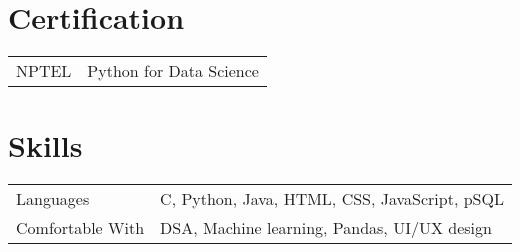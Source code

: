 \documentclass[a4paper,12pt]{article}
\begin{document}
\section{Certification}
\begin{tabularx}{\linewidth}{@{}l X@{}}
NPTEL & \normalsize{Python for Data Science} \\
\end{tabularx}

\section{Skills}
\begin{tabularx}{\linewidth}{@{}l X@{}}
Languages &  \normalsize{C, Python, Java, HTML, CSS, JavaScript, pSQL}\\
Comfortable With  &  \normalsize{DSA, Machine learning, Pandas, UI/UX design}\\  
\end{tabularx}

\end{document}

